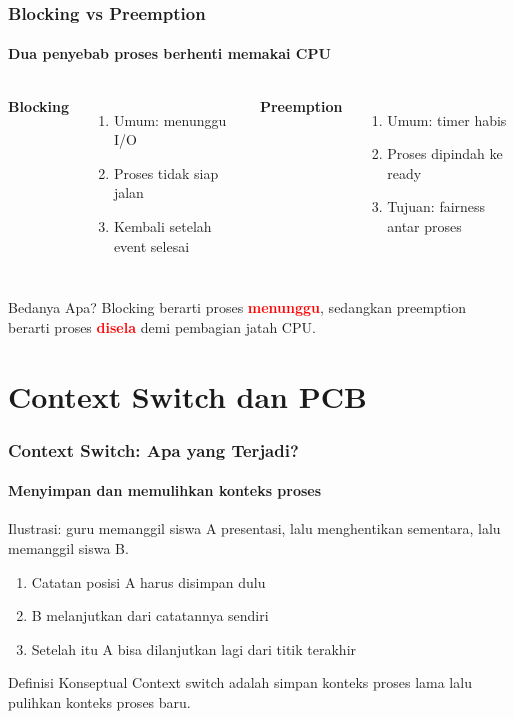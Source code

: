 \documentclass[t,aspectratio=169,xcolor=dvipsnames]{beamer}
\newcommand{\tem}[1]{\textbf{\textcolor{red}{#1}}}
\begin{document}
\begin{frame}
    \frametitle{Blocking vs Preemption}
    \framesubtitle{Dua penyebab proses berhenti memakai CPU}
    \small
    \begin{columns}[T]
        \textbf{Blocking}
        \begin{enumerate}
            \item Umum: menunggu I/O
            \item Proses tidak siap jalan
            \item Kembali setelah event selesai
        \end{enumerate}
        \textbf{Preemption}
        \begin{enumerate}
            \item Umum: timer habis
            \item Proses dipindah ke ready
            \item Tujuan: fairness antar proses
        \end{enumerate}
    \end{columns}
    \begin{alertblock}{Bedanya Apa?}
        Blocking berarti proses \tem{menunggu}, sedangkan preemption berarti proses \tem{disela} demi pembagian jatah CPU.
    \end{alertblock}
\end{frame}

\section{Context Switch dan PCB}

\begin{frame}
    \frametitle{Context Switch: Apa yang Terjadi?}
    \framesubtitle{Menyimpan dan memulihkan konteks proses}
    \small
    Ilustrasi: guru memanggil siswa A presentasi, lalu menghentikan sementara, lalu memanggil siswa B.
    \begin{enumerate}
        \item Catatan posisi A harus disimpan dulu
        \item B melanjutkan dari catatannya sendiri
        \item Setelah itu A bisa dilanjutkan lagi dari titik terakhir
    \end{enumerate}
    \begin{block}{Definisi Konseptual}
        Context switch adalah simpan konteks proses lama lalu pulihkan konteks proses baru.
    \end{block}
\end{frame}
\end{document}
